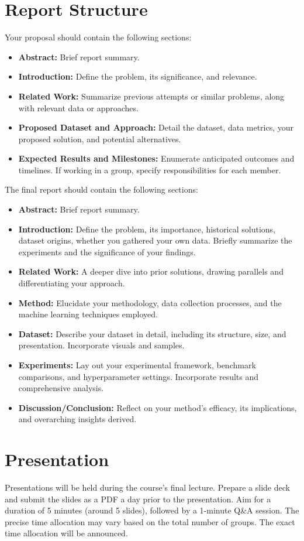 \documentclass{article}
\begin{document}
\section{Report Structure}
Your proposal should contain the following sections:
\begin{itemize}
  \item \textbf{Abstract:} Brief report summary.
  \item \textbf{Introduction:} Define the problem, its significance, and relevance.
  \item \textbf{Related Work:} Summarize previous attempts or similar problems, along with relevant data or approaches.
  \item \textbf{Proposed Dataset and Approach:} Detail the dataset, data metrics, your proposed solution, and potential alternatives.
  \item \textbf{Expected Results and Milestones:} Enumerate anticipated outcomes and timelines. If working in a group, specify responsibilities for each member.
\end{itemize}

The final report should contain the following sections:
\begin{itemize}
  \item \textbf{Abstract:} Brief report summary.
  \item \textbf{Introduction:} Define the problem, its importance, historical solutions, dataset origins, whether you gathered your own data. Briefly summarize the experiments and the significance of your findings.
  \item \textbf{Related Work:} A deeper dive into prior solutions, drawing parallels and differentiating your approach.
  \item \textbf{Method:} Elucidate your methodology, data collection processes, and the machine learning techniques employed.
  \item \textbf{Dataset:} Describe your dataset in detail, including its structure, size, and presentation. Incorporate visuals and samples.
  \item \textbf{Experiments:} Lay out your experimental framework, benchmark comparisons, and hyperparameter settings. Incorporate results and comprehensive analysis.
  \item \textbf{Discussion/Conclusion:} Reflect on your method's efficacy, its implications, and overarching insights derived.
\end{itemize}

\section{Presentation}
Presentations will be held during the course's final lecture. Prepare a slide deck and submit the slides as a PDF a day prior to the presentation. Aim for a duration of 5 minutes (around 5 slides), followed by a 1-minute Q\&A session. The precise time allocation may vary based on the total number of groups. The exact time allocation will be announced.
\end{document}
